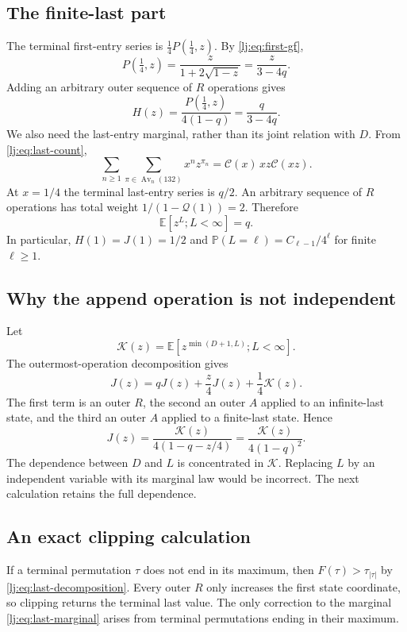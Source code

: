 \documentclass[11pt,a4paper]{article}
\theoremstyle{definition}\newaliascnt{definition}{theorem}
\theoremstyle{remark}\newaliascnt{remark}{theorem}
\newcommand{\Av}{\operatorname{Av}}
\newcommand{\Cat}{\mathcal C}
\newcommand{\ljP}{\mathbb P}
\newcommand{\ljE}{\mathbb E}
\newcommand{\ljQ}{\mathcal Q}
\newcommand{\ljK}{\mathcal K}
\begin{document}
\subsection{The finite-last part}
The terminal first-entry series is
$\tfrac14P(\tfrac14,z)$. By \eqref{lj:eq:first-gf},
\[
 P(\tfrac14,z)=\frac{z}{1+2\sqrt{1-z}}=\frac{z}{3-4q}.
\]
Adding an arbitrary outer sequence of $R$ operations gives
\begin{equation}
 H(z)=\frac{P(\tfrac14,z)}{4(1-q)}
 =\frac{q}{3-4q}.
 \label{lj:eq:H}
\end{equation}
We also need the last-entry marginal, rather than its joint relation
with $D$. From \eqref{lj:eq:last-count},
\[
 \sum_{n\ge1}\sum_{\pi\in\Av_n(132)}x^nz^{\pi_n}
 =\Cat(x)\,xz\Cat(xz).
\]
At $x=1/4$ the terminal last-entry series is $q/2$. An arbitrary
sequence of $R$ operations has total weight
$1/(1-\ljQ(1))=2$. Therefore
\begin{equation}
 \ljE[z^L;L<\infty]=q.
 \label{lj:eq:last-marginal}
\end{equation}
In particular, $H(1)=J(1)=1/2$ and
$\ljP(L=\ell)=C_{\ell-1}/4^\ell$ for finite $\ell\ge1$.

\subsection{Why the append operation is not independent}
Let
\begin{equation}
 \ljK(z)=\ljE[z^{\min(D+1,L)};L<\infty].
 \label{lj:eq:K-definition}
\end{equation}
The outermost-operation decomposition gives
\[
 J(z)=qJ(z)+\frac z4J(z)+\frac14\ljK(z).
\]
The first term is an outer $R$, the second an outer $A$ applied to an
infinite-last state, and the third an outer $A$ applied to a finite-last
state. Hence
\begin{equation}
 J(z)=\frac{\ljK(z)}{4(1-q-z/4)}
 =\frac{\ljK(z)}{4(1-q)^2}.
 \label{lj:eq:J}
\end{equation}
The dependence between $D$ and $L$ is concentrated in $\ljK$.
Replacing $L$ by an independent variable with its marginal law would
be incorrect. The next calculation retains the full dependence.

\subsection{An exact clipping calculation}
If a terminal permutation $\tau$ does not end in its maximum, then
$F(\tau)>\tau_{|\tau|}$ by \eqref{lj:eq:last-decomposition}. Every
outer $R$ only increases the first state coordinate, so clipping returns
the terminal last value. The only correction to the marginal
\eqref{lj:eq:last-marginal} arises from terminal permutations ending in
their maximum.
\end{document}
